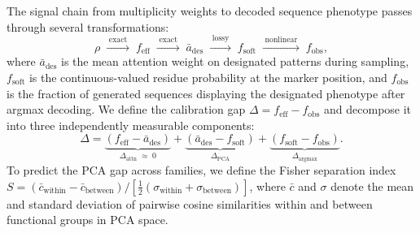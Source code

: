 The signal chain from multiplicity weights to decoded sequence phenotype passes through several
transformations:
\begin{equation}\label{eq:signal-chain}
  \rho
  \;\xrightarrow{\;\text{exact}\;}\;
  f_{\mathrm{eff}}
  \;\xrightarrow{\;\text{exact}\;}\;
  \bar{a}_{\mathrm{des}}
  \;\xrightarrow{\;\text{lossy}\;}\;
  f_{\mathrm{soft}}
  \;\xrightarrow{\;\text{nonlinear}\;}\;
  f_{\mathrm{obs}},
\end{equation}
where $\bar{a}_{\mathrm{des}}$ is the mean attention weight on designated patterns during
sampling, $f_{\mathrm{soft}}$ is the continuous-valued residue probability at the marker position,
and $f_{\mathrm{obs}}$ is the fraction of generated sequences displaying the designated phenotype
after argmax decoding. We define the calibration gap $\Delta = f_{\mathrm{eff}} - f_{\mathrm{obs}}$
and decompose it into three independently measurable components:
\begin{equation}\label{eq:gap-decomp}
  \Delta = \underbrace{(f_{\mathrm{eff}} - \bar{a}_{\mathrm{des}})}_{\Delta_{\mathrm{attn}}\;\approx\;0}
  + \underbrace{(\bar{a}_{\mathrm{des}} - f_{\mathrm{soft}})}_{\Delta_{\mathrm{PCA}}}
  + \underbrace{(f_{\mathrm{soft}} - f_{\mathrm{obs}})}_{\Delta_{\mathrm{argmax}}}.
\end{equation}
To predict the PCA gap across families, we define the Fisher separation index
$S = (\bar{c}_{\mathrm{within}} - \bar{c}_{\mathrm{between}}) /
[\tfrac{1}{2}(\sigma_{\mathrm{within}} + \sigma_{\mathrm{between}})]$, where $\bar{c}$ and
$\sigma$ denote the mean and standard deviation of pairwise cosine similarities within and
between functional groups in PCA space.
